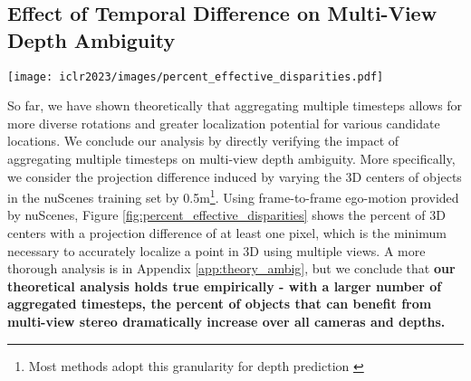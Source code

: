 \documentclass[runningheads, hyperfootnotes=false]{article}
\begin{document}
\subsection{Effect of Temporal Difference on Multi-View Depth Ambiguity}
\begin{figure*}[t]
  \centering
  \texttt{[image: iclr2023/images/percent\_effective\_disparities.pdf]}
  \captionsetup{aboveskip=0pt}\captionsetup{belowskip=0pt}\caption{Visualization of \% of objects that can benefit from multi-view stereo.}
  \label{fig:percent_effective_disparities}
\end{figure*}
 So far, we have shown theoretically that aggregating multiple timesteps allows for more diverse rotations and greater localization potential for various candidate locations. We conclude our analysis by directly verifying the impact of aggregating multiple timesteps on multi-view depth ambiguity. More specifically, we consider the projection difference induced by varying the 3D centers of objects in the nuScenes training set by 0.5m\footnote{Most methods adopt this granularity for depth prediction \citep{li2022bevdepth, li2022bevstereo, Liu2022BEVFusionMM}}. Using frame-to-frame ego-motion provided by nuScenes, Figure \ref{fig:percent_effective_disparities} shows the percent of 3D centers with a projection difference of at least one pixel, which is the minimum necessary to accurately localize a point in 3D using multiple views. A more thorough analysis is in Appendix \ref{app:theory_ambig}, but we conclude that \textbf{our theoretical analysis holds true empirically - with a larger number of aggregated timesteps, the percent of objects that can benefit from multi-view stereo dramatically increase over all cameras and depths.}
\end{document}
